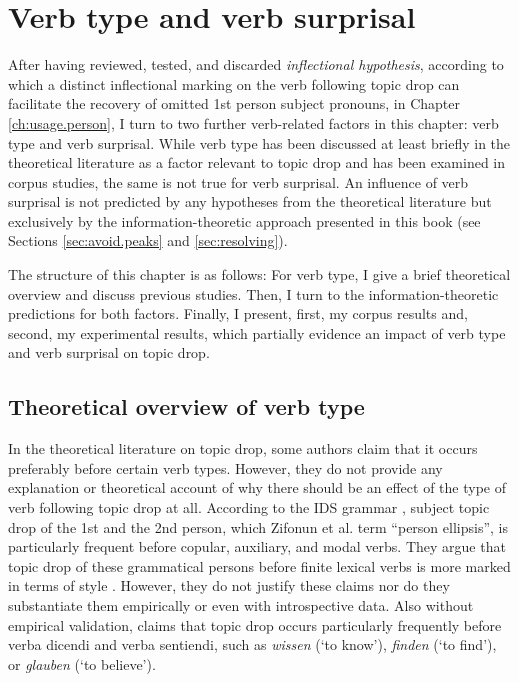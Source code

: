 \chapter{Verb type and verb surprisal}\label{ch:usage.verb}
After having reviewed, tested, and discarded  \textit{inflectional hypothesis}, according to which a distinct inflectional marking on the verb following topic drop can facilitate the recovery of omitted 1st person subject pronouns, in Chapter \ref{ch:usage.person}, I turn to two further verb-related factors in this chapter: verb type and verb surprisal.
While verb type has been discussed at least briefly in the theoretical literature as a factor relevant to topic drop and has been examined in corpus studies, the same is not true for verb surprisal.
An influence of verb surprisal is not predicted by any hypotheses from the theoretical literature but exclusively by the information-theoretic approach presented in this book (see Sections \ref{sec:avoid.peaks} and \ref{sec:resolving}).

The structure of this chapter is as follows:
For verb type, I give a brief theoretical overview and discuss previous studies.
Then, I turn to the information-theoretic predictions for both factors.
Finally, I present, first, my corpus results and, second, my experimental results, which partially evidence an impact of verb type and verb surprisal on topic drop.

\section{Theoretical overview of verb type}\label{sec:usage.verb.type.theory}    
In the theoretical literature on topic drop, some authors claim that it occurs preferably before certain verb types.
However, they do not provide any explanation or theoretical account of why there should be an effect of the type of verb following topic drop at all.
According to the IDS grammar \citep[415]{zifonun.etal1997}, subject topic drop of the 1st and the 2nd person, which Zifonun et al. term ``person ellipsis'', is particularly frequent before copular, auxiliary, and modal verbs.
They argue that topic drop of these grammatical persons before finite lexical verbs is more marked in terms of style \citep[415]{zifonun.etal1997}.
However, they do not justify these claims nor do they substantiate them empirically or even with introspective data.
Also without empirical validation, \citet[297]{imo2013}  claims that topic drop occurs particularly frequently before verba dicendi and verba sentiendi, such as \textit{wissen} (`to know'), \textit{finden} (`to find'), or \textit{glauben} (`to believe').

